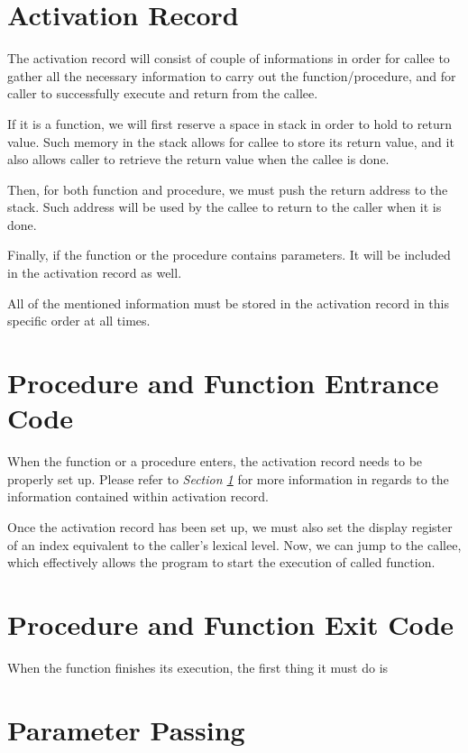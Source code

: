 \documentclass{article}
\begin{document}
\section{Activation Record} \label{rec}

The activation record will consist of couple of informations in order for callee to gather all the necessary information to carry out the function/procedure, and for caller to successfully execute and return from the callee.

If it is a function, we will first reserve a space in stack in order to hold to return value. Such memory in the stack allows for callee to store its return value, and it also allows caller to retrieve the return value when the callee is done.

Then, for both function and procedure, we must push the return address to the stack. Such address will be used by the callee to return to the caller when it is done.

Finally, if the function or the procedure contains parameters. It will be included in the activation record as well.

All of the mentioned information must be stored in the activation record in this specific order at all times.

\section{Procedure and Function Entrance Code}

When the function or a procedure enters, the activation record needs to be properly set up. Please refer to {\it Section \ref{rec}} for more information in regards to the information contained within activation record.

Once the activation record has been set up, we must also set the display register of an index equivalent to the caller's lexical level. Now, we can jump to the callee, which effectively allows the program to start the execution of called function.

\section{Procedure and Function Exit Code}

When the function finishes its execution, the first thing it must do is 

\section{Parameter Passing}
\end{document}
